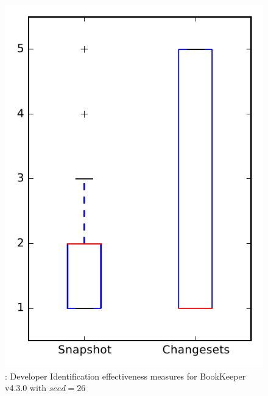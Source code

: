 
\begin{figure}
\centering
\includegraphics[height=0.4\textheight]{figures/dit_seed/rq1_bookkeeper_26}
\caption{\rtwo: Developer Identification effectiveness measures for BookKeeper v4.3.0 with $seed=26$}
\label{fig:dit_seed:rq1:bookkeeper}
\end{figure}

